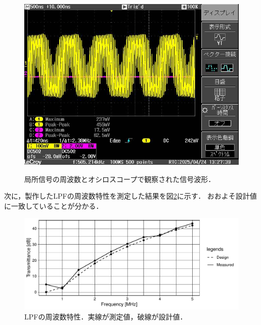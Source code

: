 \documentclass[uplatex,dvipdfmx,a4j,12pt]{jsarticle}
\begin{document}
\begin{figure}[H]
\begin{minipage}
        \label{fig:4-1-b}
    \end{minipage}
    \begin{minipage}
        [b]{0.45\linewidth}
        \centering
        \includegraphics[width=\linewidth]{img/4_1_11MHz.jpg}
        \label{fig:4-1-c}
    \end{minipage}
    \caption{局所信号の周波数とオシロスコープで観察された信号波形．}
    \label{fig:4-1}
\end{figure}



次に，製作したLPFの周波数特性を測定した結果を図\ref{fig:4-2}に示す．
おおよそ設計値に一致していることが分かる．
\begin{figure}[H]
    \centering
    \includegraphics[width=\linewidth]{data/4_1/transmittance.pdf}
    \caption{LPFの周波数特性．実線が測定値，破線が設計値．}
    \label{fig:4-2}
\end{figure}
\end{document}
